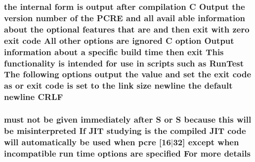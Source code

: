 \subsubsection[{\texorpdfstring{C\+R\+LF}{CRLF}}]{\setlength{\rightskip}{0pt plus 5cm}the internal form {\bf is} {\bf output} {\bf after} {\bf compilation} {\bf C} Output the version {\bf number} {\bf of} the {\bf P\+C\+RE} and {\bf all} avail {\bf able} information about the {\bf optional} {\bf features} that {\bf are} and then {\bf exit} {\bf with} {\bf zero} {\bf exit} {\bf code} All other {\bf options} {\bf are} {\bf ignored} {\bf C} {\bf option} Output information about {\bf a} specific build {\bf time} then {\bf exit} This functionality {\bf is} intended for use {\bf in} {\bf scripts} such {\bf as} Run\+Test The following {\bf options} {\bf output} the {\bf value} and {\bf set} the {\bf exit} {\bf code} {\bf as} {\bf or} {\bf exit} {\bf code} {\bf is} {\bf set} {\bf to} the link {\bf size} {\bf newline} the {\bf default} {\bf newline} C\+R\+LF}\hypertarget{pcretest_8txt_a102160bdcd612f0e349487831d0bd77e}{}\label{pcretest_8txt_a102160bdcd612f0e349487831d0bd77e}
\subsubsection[{\texorpdfstring{details}{details}}]{ must {\bf not} {\bf be} {\bf given} immediately {\bf after} {\bf S} {\bf or} {\bf S} because {\bf this} will {\bf be} misinterpreted If J\+IT {\bf studying} {\bf is} the {\bf compiled} J\+IT {\bf code} will automatically {\bf be} {\bf used} when {\bf pcre} \mbox{[}16$\vert$32\mbox{]} {\bf except} when incompatible {\bf run} {\bf time} {\bf options} {\bf are} {\bf specified} For more details}\hypertarget{pcretest_8txt_a6e95cd1d755c3f872f44f3e0dad7dabe}{}\label{pcretest_8txt_a6e95cd1d755c3f872f44f3e0dad7dabe}
